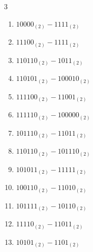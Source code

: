 \begin{multicols}{3}
\begin{enumerate}
\columnbreak %

\resetques

  \item $10000_{(2)} - 1111_{(2)}$


  \item $11100_{(2)} - 1111_{(2)}$


  \item $110110_{(2)} - 1011_{(2)}$


  \item $110101_{(2)} - 100010_{(2)}$


  \item $111100_{(2)} - 11001_{(2)}$


  \item $111110_{(2)} - 100000_{(2)}$


  \item $101110_{(2)} - 11011_{(2)}$


  \item $110110_{(2)} - 101110_{(2)}$


  \item $101011_{(2)} - 11111_{(2)}$


  \item $100110_{(2)} - 11010_{(2)}$


\columnbreak %

  \item $101111_{(2)} - 10110_{(2)}$


  \item $11110_{(2)} - 11011_{(2)}$


  \item $10101_{(2)} - 1101_{(2)}$



\end{enumerate}
\end{multicols}
